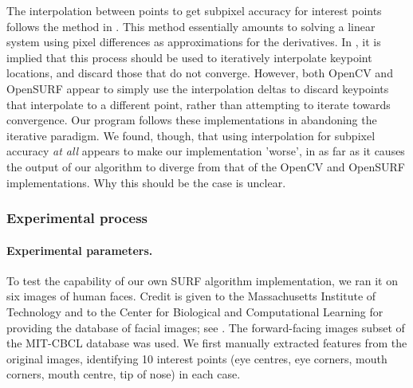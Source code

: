 The interpolation between points to get subpixel accuracy for interest points follows the method in \cite{inv-features}. This method essentially amounts to solving a linear system using pixel differences as approximations for the derivatives. In \cite{SURF}, it is implied that this process should be used to iteratively interpolate keypoint locations, and discard those that do not converge. However, both OpenCV and OpenSURF appear to simply use the interpolation deltas to discard keypoints that interpolate to a different point, rather than attempting to iterate towards convergence. Our program follows these implementations in abandoning the iterative paradigm. We found, though, that using interpolation for subpixel accuracy \emph{at all} appears to make our implementation 'worse', in as far as it causes the output of our algorithm to diverge from that of the OpenCV and OpenSURF implementations. Why this should be the case is unclear.

\subsubsection{Experimental process}

\paragraph{Experimental parameters.}
To test the capability of our own SURF algorithm implementation, we ran it on six images of human faces. Credit is given to the Massachusetts Institute of Technology and to the Center for Biological and Computational Learning for providing the database of facial images; see \cite{database}. The forward-facing images subset of the MIT-CBCL database was used. We first manually extracted features from the original images, identifying 10 interest points (eye centres, eye corners, mouth corners, mouth centre, tip of nose) in each case.

